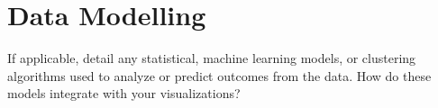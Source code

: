 \section{Data Modelling}
If applicable, detail any statistical, machine learning models, or clustering algorithms used to analyze or predict outcomes from the data. How do these models integrate with your visualizations? 